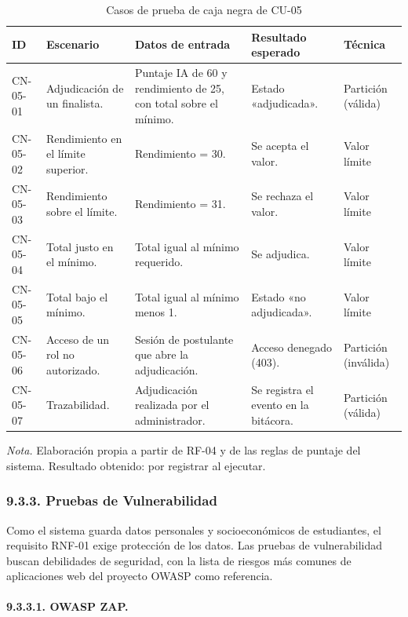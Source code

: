 \begin{table}[H]
\centering
\caption{Casos de prueba de caja negra de CU-05}
\label{tab:cn_cu05}
\small
\begin{tabular}{@{}p{1.1cm}p{3.7cm}p{4.0cm}p{3.1cm}p{1.8cm}@{}}
\toprule
\textbf{ID} & \textbf{Escenario} & \textbf{Datos de entrada} & \textbf{Resultado esperado} & \textbf{Técnica} \\
\midrule
CN-05-01 & Adjudicación de un finalista. & Puntaje IA de 60 y rendimiento de 25, con total sobre el mínimo. & Estado «adjudicada». & Partición (válida) \\
CN-05-02 & Rendimiento en el límite superior. & Rendimiento = 30. & Se acepta el valor. & Valor límite \\
CN-05-03 & Rendimiento sobre el límite. & Rendimiento = 31. & Se rechaza el valor. & Valor límite \\
CN-05-04 & Total justo en el mínimo. & Total igual al mínimo requerido. & Se adjudica. & Valor límite \\
CN-05-05 & Total bajo el mínimo. & Total igual al mínimo menos 1. & Estado «no adjudicada». & Valor límite \\
CN-05-06 & Acceso de un rol no autorizado. & Sesión de postulante que abre la adjudicación. & Acceso denegado (403). & Partición (inválida) \\
CN-05-07 & Trazabilidad. & Adjudicación realizada por el administrador. & Se registra el evento en la bitácora. & Partición (válida) \\
\bottomrule
\end{tabular}

\vspace{2pt}
\footnotesize\textit{Nota.} Elaboración propia a partir de RF-04 y de las reglas de puntaje del sistema. Resultado obtenido: por registrar al ejecutar.
\end{table}

\subsubsection{9.3.3. Pruebas de Vulnerabilidad}

Como el sistema guarda datos personales y socioeconómicos de estudiantes, el requisito RNF-01 exige protección de los datos. Las pruebas de vulnerabilidad buscan debilidades de seguridad, con la lista de riesgos más comunes de aplicaciones web del proyecto OWASP como referencia.

\paragraph{9.3.3.1. OWASP ZAP.}

